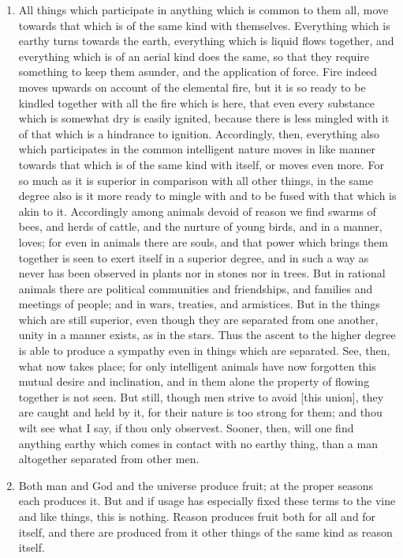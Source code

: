 \begin{enumerate}
\item All things which participate in anything which is common to them all, move towards that which is of the same kind with themselves. Everything which is earthy turns towards the earth, everything which is liquid flows together, and everything which is of an aerial kind does the same, so that they require something to keep them asunder, and the application of force. Fire indeed moves upwards on account of the elemental fire, but it is so ready to be kindled together with all the fire which is here, that even every substance which is somewhat dry is easily ignited, because there is less mingled with it of that which is a hindrance to ignition. Accordingly, then, everything also which participates in the common intelligent nature moves in like manner towards that which is of the same kind with itself, or moves even more. For so much as it is superior in comparison with all other things, in the same degree also is it more ready to mingle with and to be fused with that which is akin to it. Accordingly among animals devoid of reason we find swarms of bees, and herds of cattle, and the nurture of young birds, and in a manner, loves; for even in animals there are souls, and that power which brings them together is seen to exert itself in a superior degree, and in such a way as never has been observed in plants nor in stones nor in trees. But in rational animals there are political communities and friendships, and families and meetings of people; and in wars, treaties, and armistices. But in the things which are still superior, even though they are separated from one another, unity in a manner exists, as in the stars. Thus the ascent to the higher degree is able to produce a sympathy even in things which are separated. See, then, what now takes place; for only intelligent animals have now forgotten this mutual desire and inclination, and in them alone the property of flowing together is not seen. But still, though men strive to avoid [{\clarify this union}], they are caught and held by it, for their nature is too strong for them; and thou wilt see what I say, if thou only observest. Sooner, then, will one find anything earthy which comes in contact with no earthy thing, than a man altogether separated from other men.

\item Both man and God and the universe produce fruit; at the proper seasons each produces it. But and if usage has especially fixed these terms to the vine and like things, this is nothing. Reason produces fruit both for all and for itself, and there are produced from it other things of the same kind as reason itself.


\end{enumerate}
